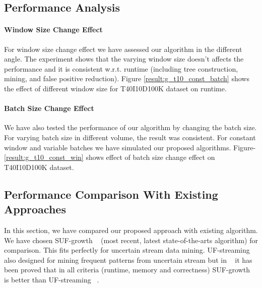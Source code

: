 \documentclass[conference]{IEEEtran}
\begin{document}
\subsection{Performance Analysis}

\paragraph{Window Size Change Effect}For window size change effect we have assessed our algorithm in the different angle. The experiment shows that the varying window size doesn't affects the performance and it is consistent w.r.t. runtime (including tree construction, mining, and false positive reduction). Figure \ref{result:g_t10_const_batch} shows the effect of different window size for T40I10D100K dataset on runtime.
                
\paragraph{Batch Size Change Effect}We have also tested the performance of our algorithm by changing the batch size. For varying batch size in different volume, the result was consistent. For constant window and variable batches we have simulated our proposed algorithms. Figure-\ref{result:g_t10_const_win} shows effect of batch size change effect on T40I10D100K dataset. 
        
\subsection{Performance Comparison With Existing Approaches}
In this section, we have compared our proposed approach with existing algorithm. We have chosen SUF-growth ~\cite{DBLP:conf/icde/LeungH09} (most recent, latest state-of-the-arts algorithm) for comparison. This fits perfectly for uncertain stream data mining. UF-streaming also designed for mining frequent patterns from uncertain stream but in ~\cite{DBLP:conf/icde/LeungH09} it has been proved that in all criteria (runtime, memory and correctness) SUF-growth ~\cite{DBLP:conf/icde/LeungH09} is better than UF-streaming ~\cite{DBLP:conf/icde/LeungH09}.
            
\end{document}
